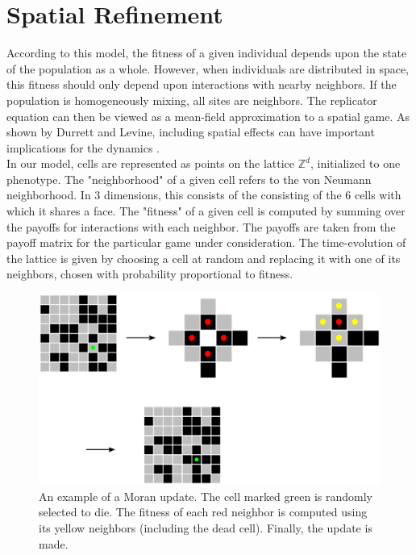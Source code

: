 \documentclass[12pt]{report}
\begin{document}
\section*{Spatial Refinement}

According to this model, the fitness of a given individual depends upon the state of the population as a whole. However, when individuals are distributed in space, this fitness should only depend upon interactions with nearby neighbors. If the population is homogeneously mixing, all sites are neighbors. The replicator equation can then be viewed as a mean-field approximation to a spatial game. As shown by Durrett and Levine, including spatial effects can have important implications for the dynamics \cite{Durrett1994}.\\

In our model, cells are represented as points on the lattice $\mathbb{Z}^d$, initialized to one phenotype. The "neighborhood" of a given cell refers to the von Neumann neighborhood. In 3 dimensions, this consists of the consisting of the 6 cells with which it shares a face. The "fitness" of a given cell is computed by summing over the payoffs for interactions with each neighbor. The payoffs are taken from the payoff matrix for the particular game under consideration. The time-evolution of the lattice is given by choosing a cell at random and replacing it with one of its neighbors, chosen with probability proportional to fitness.\\
\begin{figure}
\centering
\includegraphics[width = \linewidth]{Diagrams/General/themodel}
\caption{An example of a Moran 
update. The cell marked green is randomly selected to die. The fitness of each red neighbor is computed using its yellow neighbors (including the dead cell). Finally, the update is made.}
\end{figure}
\end{document}
